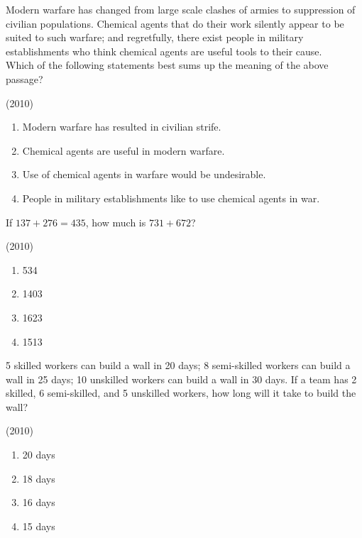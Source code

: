     \item Modern warfare has changed from large scale clashes of armies to suppression of civilian populations. Chemical agents that do their work silently appear to be suited to such warfare; and regretfully, there exist people in military establishments who think chemical agents are useful tools to their cause.\\
    Which of the following statements best sums up the meaning of the above passage?
    
    \hfill{(2010)}


            \begin{enumerate}
                \item Modern warfare has resulted in civilian strife.
                \item Chemical agents are useful in modern warfare.
                \item Use of chemical agents in warfare would be undesirable.
                \item People in military establishments like to use chemical agents in war.
            \end{enumerate}


    \item If $137+276=435$, how much is $731+672$?
    
    \hfill{(2010)}

        \begin{multicols}{4}
            \begin{enumerate}
                \item 534
                \item 1403
                \item 1623
                \item 1513
            \end{enumerate}
        \end{multicols}
        
    \item 5 skilled workers can build a wall in 20 days; 8 semi-skilled workers can build a wall in 25 days; 10 unskilled workers can build a wall in 30 days. If a team has 2 skilled, 6 semi-skilled, and 5 unskilled workers, how long will it take to build the wall?
    
    \hfill{(2010)}

        \begin{multicols}{4}
            \begin{enumerate}
                \item 20 days
                \item 18 days
                \item 16 days
                \item 15 days
            \end{enumerate}
        \end{multicols}

